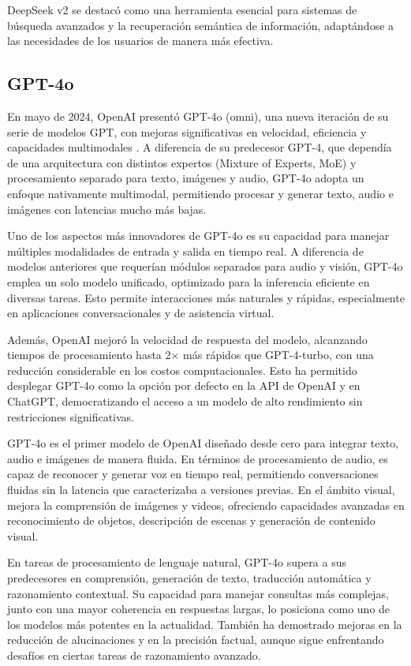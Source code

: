 DeepSeek v2 se destacó como una herramienta esencial para sistemas de búsqueda avanzados y la recuperación semántica de información, adaptándose a las necesidades de los usuarios de manera más efectiva.


\subsection{GPT-4o}

En mayo de 2024, OpenAI presentó GPT-4o (omni), una nueva iteración de su serie de modelos GPT, con mejoras significativas en velocidad, eficiencia y capacidades multimodales \cite{openai2024gpt4ocard}. 
A diferencia de su predecesor GPT-4, que dependía de una arquitectura con distintos expertos (Mixture of Experts, MoE) y procesamiento separado para texto, imágenes y audio, GPT-4o adopta un enfoque nativamente multimodal, permitiendo procesar y generar texto, audio e imágenes con latencias mucho más bajas.

Uno de los aspectos más innovadores de GPT-4o es su capacidad para manejar múltiples modalidades de entrada y salida en tiempo real. 
A diferencia de modelos anteriores que requerían módulos separados para audio y visión, GPT-4o emplea un solo modelo unificado, optimizado para la inferencia eficiente en diversas tareas. 
Esto permite interacciones más naturales y rápidas, especialmente en aplicaciones conversacionales y de asistencia virtual.

Además, OpenAI mejoró la velocidad de respuesta del modelo, alcanzando tiempos de procesamiento hasta 2× más rápidos que GPT-4-turbo, con una reducción considerable en los costos computacionales. Esto ha permitido desplegar GPT-4o como la opción por defecto en la API de OpenAI y en ChatGPT, democratizando el acceso a un modelo de alto rendimiento sin restricciones significativas.

GPT-4o es el primer modelo de OpenAI diseñado desde cero para integrar texto, audio e imágenes de manera fluida. 
En términos de procesamiento de audio, es capaz de reconocer y generar voz en tiempo real, permitiendo conversaciones fluidas sin la latencia que caracterizaba a versiones previas. 
En el ámbito visual, mejora la comprensión de imágenes y videos, ofreciendo capacidades avanzadas en reconocimiento de objetos, descripción de escenas y generación de contenido visual.

En tareas de procesamiento de lenguaje natural, GPT-4o supera a sus predecesores en comprensión, generación de texto, traducción automática y razonamiento contextual. 
Su capacidad para manejar consultas más complejas, junto con una mayor coherencia en respuestas largas, lo posiciona como uno de los modelos más potentes en la actualidad. 
También ha demostrado mejoras en la reducción de alucinaciones y en la precisión factual, aunque sigue enfrentando desafíos en ciertas tareas de razonamiento avanzado.



